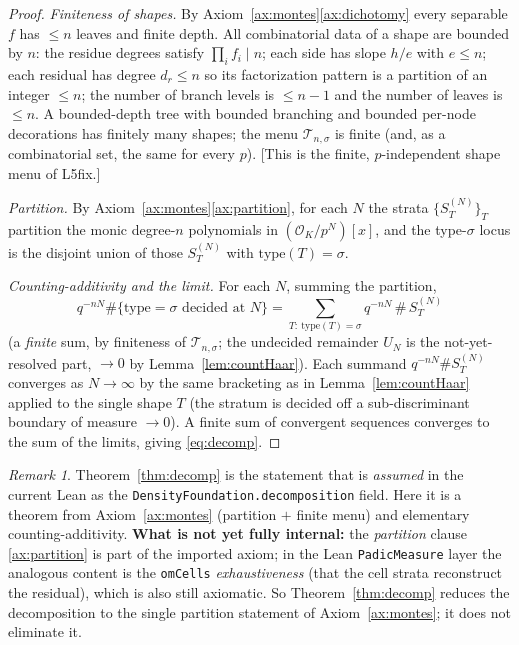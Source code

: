 \documentclass[11pt]{article}
\theoremstyle{definition}
\theoremstyle{remark}
\newtheorem{remark}[theorem]{Remark}
\newcommand{\OK}{\mathcal{O}_K}
\newcommand{\type}{\mathrm{type}}
\begin{document}
\begin{proof}
\emph{Finiteness of shapes.} By Axiom~\ref{ax:montes}\ref{ax:dichotomy} every
separable $f$ has $\le n$ leaves and finite depth. All combinatorial data of a
shape are bounded by $n$: the residue degrees satisfy $\prod_i f_i\mid n$; each
side has slope $h/e$ with $e\le n$; each residual has degree $d_r\le n$ so its
factorization pattern is a partition of an integer $\le n$; the number of branch
levels is $\le n-1$ and the number of leaves is $\le n$. A bounded-depth tree with
bounded branching and bounded per-node decorations has finitely many shapes; the
menu $\mathcal T_{n,\sigma}$ is finite (and, as a combinatorial set, the same for
every $p$). [This is the finite, $p$-independent shape menu of L5fix.]

\emph{Partition.} By Axiom~\ref{ax:montes}\ref{ax:partition}, for each $N$ the
strata $\{S_T^{(N)}\}_{T}$ partition the monic degree-$n$ polynomials in
$(\OK/p^N)[x]$, and the type-$\sigma$ locus is the disjoint union of those
$S_T^{(N)}$ with $\type(T)=\sigma$.

\emph{Counting-additivity and the limit.} For each $N$, summing the partition,
\[
  q^{-nN}\#\{\type=\sigma\text{ decided at }N\}
  = \sum_{T:\ \type(T)=\sigma} q^{-nN}\,\#\,S_T^{(N)}
\]
(a \emph{finite} sum, by finiteness of $\mathcal T_{n,\sigma}$; the undecided
remainder $U_N$ is the not-yet-resolved part, $\to0$ by Lemma~\ref{lem:countHaar}).
Each summand $q^{-nN}\#S_T^{(N)}$ converges as $N\to\infty$ by the same bracketing
as in Lemma~\ref{lem:countHaar} applied to the single shape $T$ (the stratum is
decided off a sub-discriminant boundary of measure $\to0$). A finite sum of
convergent sequences converges to the sum of the limits, giving
\eqref{eq:decomp}.
\end{proof}

\begin{remark}
Theorem~\ref{thm:decomp} is the statement that is \emph{assumed} in the current
Lean as the \texttt{DensityFoundation.decomposition} field. Here it is a theorem
from Axiom~\ref{ax:montes} (partition $+$ finite menu) and elementary
counting-additivity. \textbf{What is not yet fully internal:} the \emph{partition}
clause \ref{ax:partition} is part of the imported axiom; in the Lean
\texttt{PadicMeasure} layer the analogous content is the \texttt{omCells}
\emph{exhaustiveness} (that the cell strata reconstruct the residual), which is
also still axiomatic. So Theorem~\ref{thm:decomp} reduces the decomposition to the
single partition statement of Axiom~\ref{ax:montes}; it does not eliminate it.
\end{remark}
\end{document}

